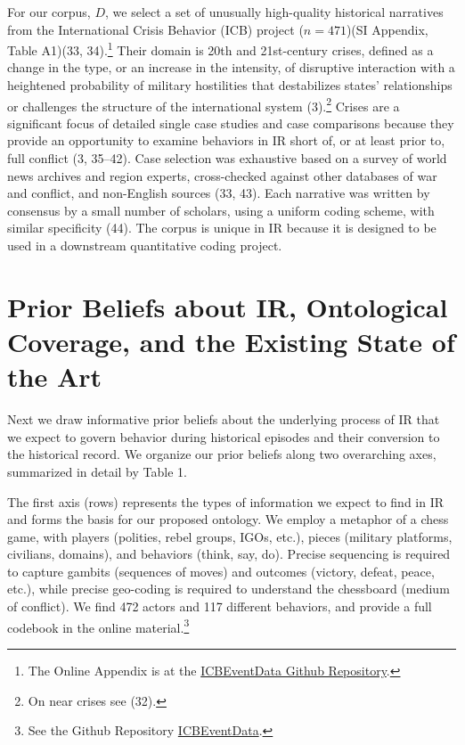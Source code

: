 \documentclass{article}
\begin{document}
For our corpus, \(D\), we select a set of unusually high-quality
historical narratives from the International Crisis Behavior (ICB)
project (\(n=471\))(SI Appendix, Table A1)(33, 34).\footnote{The Online
  Appendix is at the
  \href{https://urldefense.com/v3/__https://github.com/CenterForPeaceAndSecurityStudies/ICBEventData__;!!Mih3wA!WxDJtEczKfxGTh0S2Krunap8ReymFEL5iTWaSfOHeqlSdyfRx77zmjBSWO1OAm13$}{ICBEventData
  Github Repository}.} Their domain is 20th and 21st-century crises,
defined as a change in the type, or an increase in the intensity, of
disruptive interaction with a heightened probability of military
hostilities that destabilizes states' relationships or challenges the
structure of the international system (3).\footnote{On near crises see
  (32).} Crises are a significant focus of detailed single case studies
and case comparisons because they provide an opportunity to examine
behaviors in IR short of, or at least prior to, full conflict (3,
35--42). Case selection was exhaustive based on a survey of world news
archives and region experts, cross-checked against other databases of
war and conflict, and non-English sources (33, 43). Each narrative was
written by consensus by a small number of scholars, using a uniform
coding scheme, with similar specificity (44). The corpus is unique in IR
because it is designed to be used in a downstream quantitative coding
project.

\hypertarget{prior-beliefs-about-ir-ontological-coverage-and-the-existing-state-of-the-art}{%
\section*{Prior Beliefs about IR, Ontological Coverage, and the Existing
State of the
Art}\label{prior-beliefs-about-ir-ontological-coverage-and-the-existing-state-of-the-art}}

Next we draw informative prior beliefs about the underlying process of
IR that we expect to govern behavior during historical episodes and
their conversion to the historical record. We organize our prior beliefs
along two overarching axes, summarized in detail by Table 1.

The first axis (rows) represents the types of information we expect to
find in IR and forms the basis for our proposed ontology. We employ a
metaphor of a chess game, with players (polities, rebel groups, IGOs,
etc.), pieces (military platforms, civilians, domains), and behaviors
(think, say, do). Precise sequencing is required to capture gambits
(sequences of moves) and outcomes (victory, defeat, peace, etc.), while
precise geo-coding is required to understand the chessboard (medium of
conflict). We find 472 actors and 117 different behaviors, and provide a
full codebook in the online material.\footnote{See the Github Repository
  \href{https://urldefense.com/v3/__https://github.com/CenterForPeaceAndSecurityStudies/ICBEventData__;!!Mih3wA!WxDJtEczKfxGTh0S2Krunap8ReymFEL5iTWaSfOHeqlSdyfRx77zmjBSWO1OAm13$}{ICBEventData}.}
\end{document}
